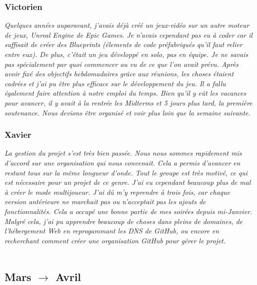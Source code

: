 \documentclass[a4paper,12pt]{article}
\begin{document}
        \subsubsection{Victorien}
        \textit{Quelques années auparavant, j’avais déjà créé un jeux-vidéo 
        sur un autre moteur de jeux, \textsl{Unreal Engine} de \textsl{Epic Games}. 
        Je n’avais cependant pas eu à coder car il suffisait de créer des
        \textsl{Blueprints} (élements de code préfabriqués qu’il faut relier 
        entre eux). De plus, c’était un jeu développé en solo, pas en équipe.
        Je ne savais pas spécialement par quoi commencer au vu de ce que l’on
        avait prévu. Après avoir fixé des objectifs hebdomadaires grâce aux 
        réunions, les choses étaient cadrées et j’ai pu être plus efficace sur
        le développement du jeu. Il a fallu également faire attention à notre 
        emploi du temps. Bien qu’il y eût les vacances pour avancer, il y avait 
        à la rentrée les Midterms et 5 jours plus tard, la première soutenance. 
        Nous devions être organisé et voir plus loin que la semaine suivante.}
  
        \subsubsection{Xavier}
        \textit{La gestion du projet s'est très bien passée. Nous nous sommes
        rapidement mis d'accord sur une organisation qui nous convenait. Cela a
        permis d'avancer en restant tous sur la même longueur d'onde. Tout le
        groupe est très motivé, ce qui est nécessaire pour un projet de ce genre.
        J'ai eu cependant beaucoup plus de mal à créer le mode multijoueur. J'ai
        dû m'y reprendre à trois fois, car chaque version antérieure
        ne marchait pas ou n'acceptait pas les ajouts de fonctionnalités. Cela a
        occupé une bonne partie de mes soirées depuis mi-Janvier. Malgré cela, 
        j'ai pu apprendre beaucoup de choses dans pleins de domaines, de
        l'hébergement Web en reprogammant les \textit{DNS} de \textsl{GitHub}, 
        ou encore en recherchant comment créer une organisation \textsl{GitHub} 
        pour gérer le projet.}\\\\
    
        \clearpage
     \subsection{Mars $\to$ Avril}
\end{document}

